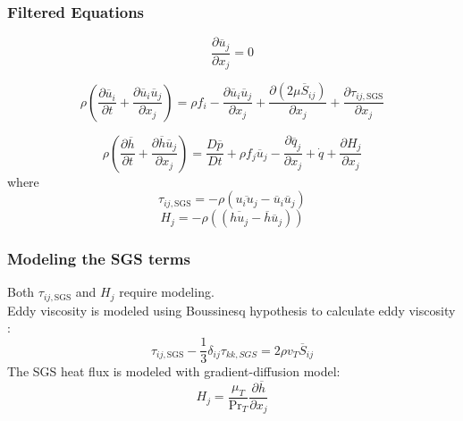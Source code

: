 \documentclass{beamer}
\begin{document}
\begin{frame}
  \frametitle{Filtered Equations}
 \begin{equation}
  \frac{\partial \overline{u}_j}{\partial x_j}=0
 \end{equation}

  \begin{equation}
    \rho \left( \frac{\partial \overline{u}_i}{\partial t} + 
    \frac{\partial \overline{u}_i \overline{u}_j}{\partial x_j} \right)= 
     \rho f_i -\frac{\partial \overline{u}_i \overline{u}_j}{\partial x_j} 
     + \frac{\partial (2 \mu \overline{S}_{ij})}{\partial x_j} 
     + \frac{\partial \tau_{ij, \text{SGS}}}{\partial x_j}
  \end{equation}

  
  \begin{equation}
    \rho \left( \frac{\partial \overline{h}}{\partial t} +
     \frac{\partial \overline{h} \overline{u}_j}{\partial x_j} \right) 
     =  \frac{D \overline{p}}{D t} + \rho f_j \overline{u}_j -
      \frac{\partial \overline{q}_j}{\partial x_j} + \dot{q} +
      \frac{\partial H_j}{\partial x_j}
  \end{equation}
where 
\begin{equation}
  \tau_{ij, \text{SGS}}=-\rho (\overline{u_i u_j}-\overline{u}_i \overline{u}_j)
\end{equation}
\begin{equation}
  H_j=-\rho((\overline{h u_j}-\overline{h} \overline{u}_j))
\end{equation}

\end{frame}

\begin{frame}
  \frametitle{Modeling the SGS terms}
Both $\tau_{ij, \text{SGS}}$ and $H_j$ require modeling.\\
Eddy viscosity is modeled using Boussinesq hypothesis to calculate eddy viscosity \cite{zouLARGEEDDYSIMULATION2006}:
\begin{equation}
  \tau_{ij,\text{SGS}} - \frac{1}{3}\delta_{ij}\tau_{kk,SGS} =  2\rho v_T \overline{S}_{ij}
\end{equation}
The SGS heat flux is modeled with gradient-diffusion model\cite{zouLARGEEDDYSIMULATION2006}:
\begin{equation}
  H_j = \frac{\mu_T}{\text{Pr}_T} \frac{\partial \overline{h}}{\partial x_j}
\end{equation}
\end{frame}



\begin{frame}
  
   
  
\end{frame}
\end{document}
